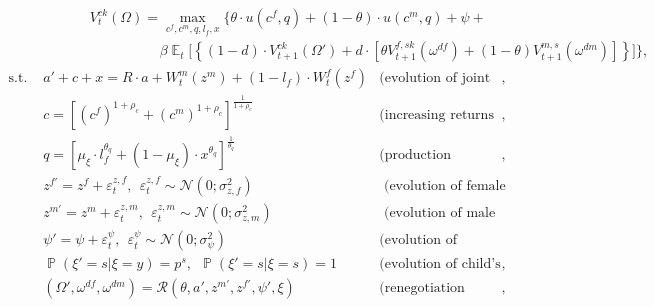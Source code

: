 \documentclass[12pt,letter]{article}
\DeclareMathOperator{\E}{\mathbb{E}}
\DeclareMathOperator{\PP}{\mathbb{P}}
\renewcommand{\P}{\PP}
\begin{document}
\begin{align}& \hspace{5em}  V^{ck}_t(\Omega) = \max\limits_{c^f,c^m,q,l_f,x}  \bigg\{ \theta\cdot u(c^f,q) + (1-\theta)\cdot u(c^m,q) + \psi + \label{vf_ck} \\  \nonumber
 & \hspace{10em} \beta \E_t \Big[   \left\{ (1-d)\cdot   V^{ck}_{t+1}(\Omega') + d\cdot [ \theta V_{t+1}^{f,sk}(\omega^{df}) + (1-\theta)V_{t+1}^{m,s}(\omega^{dm})]\right\} \Big] \bigg\},
\end{align}\vspace{-2em}
\begin{align*}
\text{s.t. \ } & a' + c + x = R\cdot a  + W^m_t(z^m) + (1-l_f)\cdot W^f_t(z^f) & \text{(evolution of joint assets)},\\
                    & c = [(c^f)^{1+\rho_c} + (c^m)^{1+\rho_c}]^{\frac1{1+\rho_c}} & \text{(increasing returns in consumption)},\\
                    & q = [\mu_\xi\cdot l_f^{\theta_q} + (1-\mu_\xi)\cdot x^{\theta_q}]^{\frac1{\theta_q}} & \text{(production function of child quality)},\\
                    &  z^{f\prime} = z^f + \varepsilon^{z,f}_t, \ \ \varepsilon^{z,f}_t \sim \mathcal{N}(0;\sigma_{z,f}^2) &  \text{ (evolution of female productivity)}\\
				 &  z^{m\prime} = z^m + \varepsilon^{z,m}_t, \ \ \varepsilon^{z,m}_t \sim \mathcal{N}(0;\sigma_{z,m}^2) &  \text{ (evolution of male productivity)}\\
                    & \psi' = \psi + \varepsilon^{\psi}_t, \ \ \varepsilon^{\psi}_t \sim \mathcal{N}(0;\sigma_{\psi}^2)  & \text{(evolution of marriage surplus),} \\
                   &  \P(\xi' = s | \xi = y) = p^s, \ \ \P(\xi' = s | \xi = s) = 1 & \text{(evolution of child's age)},\\
                    & (\Omega',\omega^{df},\omega^{dm}) = \mathcal{R}(\theta,a',z^{m\prime},z^{f\prime},\psi',\xi) & \text{(renegotiation correspondence)},
\end{align*}
\end{document}

